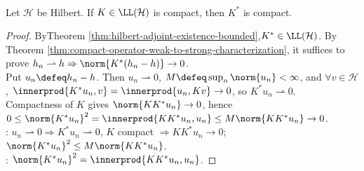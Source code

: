 \begin{theorem} \label{thm:schauder-compact-adjoint} \\
Let $\mathcal{H}$ be Hilbert. If $K\in\LL(\mathcal{H})$ is compact, then $K^*$ is compact.
\begin{proof} ByTheorem \ref{thm:hilbert-adjoint-existence-bounded},$K^*\in\LL(\mathcal{H})$. By Theorem \ref{thm:compact-operator-weak-to-strong-characterization}, it suffices to prove $h_n\rightharpoonup h\Rightarrow\norm{K^*(h_n-h)}\to0$.\\
Put $u_n\defeq h_n-h$. Then $u_n\rightharpoonup0$, $M\defeq\sup_n\norm{u_n}<\infty$, and $\forall v\in\mathcal{H}$, $\innerprod{K^*u_n,v}=\innerprod{u_n,Kv}\to0$, so $K^*u_n\rightharpoonup0$.\\
Compactness of $K$ gives $\norm{KK^*u_n}\to0$, hence $0\leq\norm{K^*u_n}^2=\innerprod{KK^*u_n,u_n}\leq M\norm{KK^*u_n}\to0$.\\
: $u_n\rightharpoonup0\Rightarrow K^*u_n\rightharpoonup0$, $K$ compact $\Rightarrow KK^*u_n\to0$; $\norm{K^*u_n}^2\leq M\norm{KK^*u_n}$.\\
: $\norm{K^*u_n}^2=\innerprod{KK^*u_n,u_n}$.
\end{proof}
\end{theorem}

